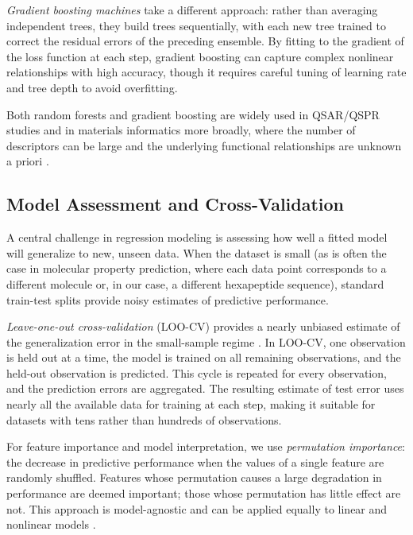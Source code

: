 \emph{Gradient boosting machines} \cite{Friedman2001GBM} take a different
approach: rather than averaging independent trees, they build trees
sequentially, with each new tree trained to correct the residual errors of the
preceding ensemble. By fitting to the gradient of the loss function at each
step, gradient boosting can capture complex nonlinear relationships with high
accuracy, though it requires careful tuning of learning rate and tree depth to
avoid overfitting.

Both random forests and gradient boosting are widely used in QSAR/QSPR studies
and in materials informatics more broadly, where the number of descriptors can
be large and the underlying functional relationships are unknown a priori
\cite{Cherkasov2014QSAR}.

\subsection{Model Assessment and Cross-Validation}

A central challenge in regression modeling is assessing how well a fitted model
will generalize to new, unseen data. When the dataset is small (as is often the
case in molecular property prediction, where each data point corresponds to a
different molecule or, in our case, a different hexapeptide sequence), standard
train-test splits provide noisy estimates of predictive performance.

\emph{Leave-one-out cross-validation} (LOO-CV) provides a nearly unbiased
estimate of the generalization error in the small-sample regime
\cite{HastieTibshirani2009ESL}. In LOO-CV, one observation is held out at a
time, the model is trained on all remaining observations, and the held-out
observation is predicted. This cycle is repeated for every observation, and the
prediction errors are aggregated. The resulting estimate of test error uses
nearly all the available data for training at each step, making it suitable for
datasets with tens rather than hundreds of observations.

For feature importance and model interpretation, we use \emph{permutation
importance}: the decrease in predictive performance when the values of a single
feature are randomly shuffled. Features whose permutation causes a large
degradation in performance are deemed important; those whose permutation has
little effect are not. This approach is model-agnostic and can be applied
equally to linear and nonlinear models \cite{Breiman2001RandomForests}.

